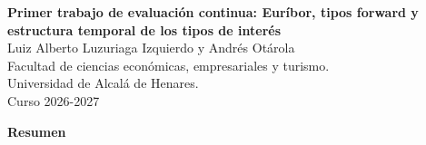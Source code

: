 \documentclass[a4paper,12pt]{article}
\begin{document}
\begin{titlepage}
    \centering
    \vspace*{0.1cm}
    \LARGE\textbf{Primer trabajo de evaluación continua: Euríbor, tipos forward y estructura temporal de los tipos de interés}\\
    \vspace{1cm}
    \small{Luiz Alberto Luzuriaga Izquierdo y Andrés Otárola}\\
    \vspace{0.1cm}
    Facultad de ciencias económicas, empresariales y turismo. \\
    \vspace{0.1cm}
    Universidad de Alcalá de Henares. \\
    \vspace{0.1cm}
    Curso 2026-2027\\
    \vspace{0.5cm}

{\bfseries Resumen}


\end{titlepage}
\end{document}
